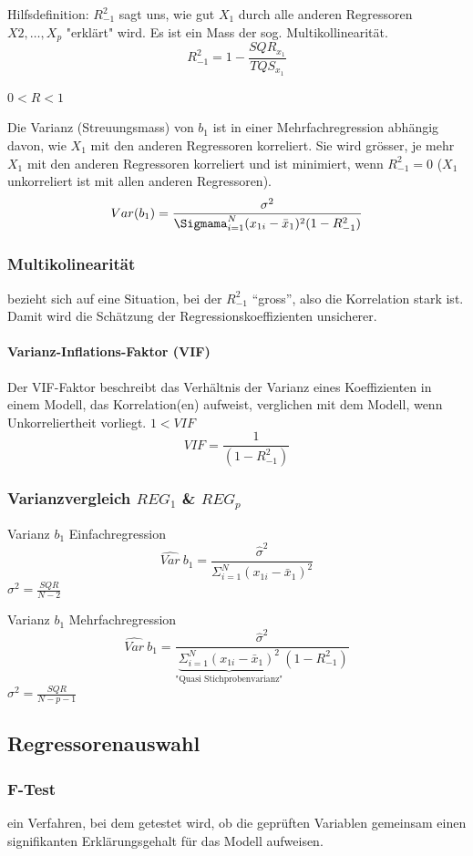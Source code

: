 \documentclass[a3paper, 8pt]{extarticle}
\begin{document}
\begin{multicols*}{5}
\begin{enumerate}
Hilfsdefinition: $R^2_{-1}$ sagt uns, wie gut $X_1$ durch alle anderen Regressoren $X2, \dots , X_p$ "erklärt" wird. Es ist ein Mass der sog. Multikollinearität.
$$R_{-1}^2=1-\frac{SQR_x_1}{TQS_x_1}$$

$0<R<1$

Die Varianz (Streuungsmass) von $b_1$ ist in einer Mehrfachregression abhängig davon, wie $X_1$ mit den anderen Regressoren korreliert. Sie wird grösser, je mehr $X_1$ mit den anderen Regressoren korreliert und ist minimiert, wenn $R^2_{−1} = 0$ ($X_1$ unkorreliert ist mit allen anderen Regressoren).
$$Var(b_1)=\frac{\sigma^2}{\Sigmama_{i=1}^N(x_{1i}-\bar{x}_1)^2(1-R^2_{-1})}$$

\subsubsection{Multikolinearität} bezieht sich auf eine Situation, bei der $R^2_{-1}$ “gross”, also die Korrelation stark ist. Damit wird die Schätzung der Regressionskoeffizienten unsicherer.

\paragraph{Varianz-Inflations-Faktor (VIF)}
Der VIF-Faktor beschreibt das Verhältnis der Varianz eines Koeffizienten in einem Modell, das Korrelation(en) aufweist, verglichen mit dem Modell, wenn Unkorreliertheit vorliegt. $1<VIF$
$$VIF=\frac{1}{(1-R^2_{-1})}$$


\subsubsection{Varianzvergleich $REG_1$ \& $REG_p$}
Varianz $b_1$ Einfachregression
$$\widehat{Var}\ {b_1}=\frac{\hat{\sigma}^2}{\Sigma_{i=1}^N(x_{1i}-\bar{x}_1)^2}$$  \hfill $\sigma^2=\frac{SQR}{N-2}$

Varianz $b_1$ Mehrfachregression
$$\widehat{Var}\ {b_1}=\frac{\hat{\sigma}^2}{\underbrace{\Sigma_{i=1}^N(x_{1i}-\bar{x}_1)^2}_\text{"Quasi Stichprobenvarianz"}(1-R^2_{-1})}$$  \hfill $\sigma^2=\frac{SQR}{N-p-1}$

\subsection{Regressorenauswahl}

\subsubsection{F-Test}
ein Verfahren, bei dem getestet wird, ob die geprüften Variablen gemeinsam einen signifikanten Erklärungsgehalt für das Modell aufweisen.


\end{enumerate}
\end{multicols*}
\end{document}
